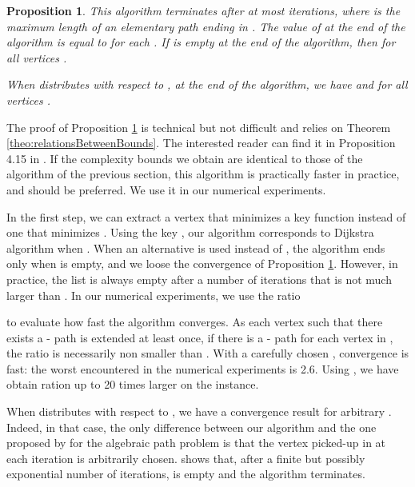 \documentclass[11pt]{amsart}
\theoremstyle{plain}
\newtheorem{prop}[theo]{Proposition}
\theoremstyle{remark}
\begin{document}


\begin{prop}\label{prop:MeetLbFastComputation}
This algorithm terminates after at most  iterations, where  is the maximum length of an elementary path ending in . The value  of  at the end of the algorithm is equal to  for each . If  is empty at the end of the algorithm, then  for all vertices .

When   distributes with respect to , at the end of the algorithm, we have  and  for all vertices .
\end{prop}

The proof of Proposition \ref{prop:MeetLbFastComputation} is technical but not difficult and relies on Theorem \ref{theo:relationsBetweenBounds}. The interested reader can find it in Proposition 4.15 in \cite{parmentier2016thesis}. If the complexity bounds we obtain are identical to those of the algorithm of the previous section, this algorithm is practically faster in practice, and should be preferred. We use it in our numerical experiments.

In the first step, we can extract a vertex  that minimizes a key function  instead of one that minimizes . Using the key , our algorithm corresponds to Dijkstra algorithm 
when . When an alternative  is used instead of , the algorithm ends only when  is empty, and we loose the convergence of Proposition \ref{prop:MeetLbFastComputation}. However, in practice, the list  is always empty after a number of iterations that is not much larger than . In our numerical experiments, we use the ratio

\noindent to evaluate how fast the algorithm converges. As each vertex  such that there exists a - path is extended at least once, if there is a - path  for each vertex  in , the ratio  is necessarily non smaller than . With a carefully chosen , convergence is fast: the worst  encountered in the numerical experiments is 2.6. Using , we have obtain ration  up to 20 times larger on the instance. 


When  distributes with respect to , we have a convergence result for arbitrary . Indeed, in that case, the only difference between our algorithm and the one proposed by \citet{mohri2002semiring} for the algebraic path problem is that the vertex picked-up in  at each iteration is arbitrarily chosen. \citet{mohri2002semiring} shows that, after a finite but possibly exponential number of iterations,  is empty and the algorithm terminates.
\end{document}
